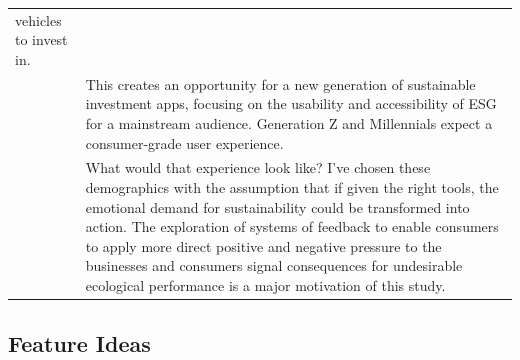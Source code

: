 \documentclass[
  letterpaper,
  DIV=11,
  numbers=noendperiod]{scrartcl}
\begin{document}
\begin{longtable}[]{@{}
  >{\raggedright\arraybackslash}p{}
  >{\raggedright\arraybackslash}p{}@{}}
vehicles to invest in. \\
& This creates an opportunity for a new generation of sustainable
investment apps, focusing on the usability and accessibility of ESG for
a mainstream audience. Generation Z and Millennials expect a
consumer-grade user experience. \\
& What would that experience look like? I've chosen these demographics
with the assumption that if given the right tools, the emotional demand
for sustainability could be transformed into action. The exploration of
systems of feedback to enable consumers to apply more direct positive
and negative pressure to the businesses and consumers signal
consequences for undesirable ecological performance is a major
motivation of this study. \\
\end{longtable}

\subsection{Feature Ideas}\label{feature-ideas}
\end{document}
